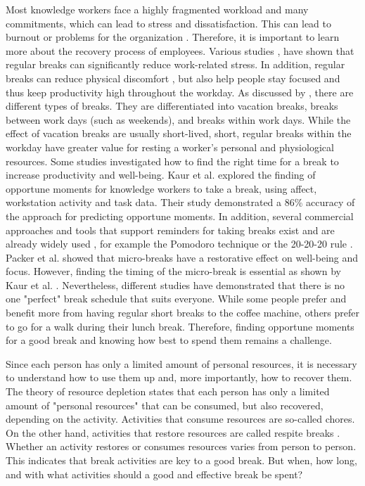 \documentclass{hasel_thesis}
\begin{document}
Most knowledge workers face a highly fragmented workload and many commitments, which can lead to stress and dissatisfaction. This can lead to burnout or problems for the organization \cite{Elkin.1990}. Therefore, it is important to learn more about the recovery process of employees. Various studies \cite{Largo-Wight.2017},\cite{KimS.ParkY.&Niu.2017} have shown that regular breaks can significantly reduce work-related stress.  In addition, regular breaks can reduce physical discomfort \cite{Waongenngarm.2018}, but also help people stay focused \cite{Ariga.2011} \cite{Bloom.2014} and thus keep productivity high throughout the workday. As discussed by \cite{Trougakos.2009}, there are different types of breaks. They are differentiated into vacation breaks, breaks between work days (such as weekends), and breaks within work days. While the effect of vacation breaks are usually short-lived, short, regular breaks within the workday have greater value for resting a worker's personal and physiological resources.
Some studies investigated how to find the right time for a break to increase productivity and well-being. Kaur et al. \cite{Kaur.2020} explored the finding of opportune moments for knowledge workers to take a break, using affect, workstation activity and task data. Their study demonstrated a 86\% accuracy of the approach for predicting opportune moments. In addition, several commercial approaches and tools that support reminders for taking breaks exist and are already widely used \cite{Alghamdi.2020}, for example the Pomodoro technique \cite{Cirillo.2006} or the 20-20-20 rule \cite{Min.2019}. Packer et al. \cite{Packer.2021} showed that micro-breaks have a restorative effect on well-being and focus.  However, finding the timing of the micro-break is essential as shown by Kaur et al. \cite{Kaur.2020}. Nevertheless, different studies \cite{KimS.ParkY.&Niu.2017} \cite{Berman.2007} have demonstrated that there is no one "perfect" break schedule that suits everyone. While some people prefer and benefit more from having regular short breaks to the coffee machine, others prefer to go for a walk during their lunch break. Therefore, finding opportune moments for a good break and knowing how best to spend them remains a challenge. 

Since each person has only a limited amount of personal resources, it is necessary to understand how to use them up and, more importantly, how to recover them. The theory of resource depletion \cite{BaumeisterR.F.BratslavskyE.MuravenM.&TiceD.M..1998} states that each person has only a limited amount of "personal resources" that can be consumed, but also recovered, depending on the activity. Activities that consume resources are so-called chores. On the other hand, activities that restore resources are called respite breaks \cite{Trougakos.2009}. Whether an activity restores or consumes resources varies from person to person. This indicates that break activities are key to a good break. But when, how long, and with what activities should a good and effective break be spent? 
\end{document}
